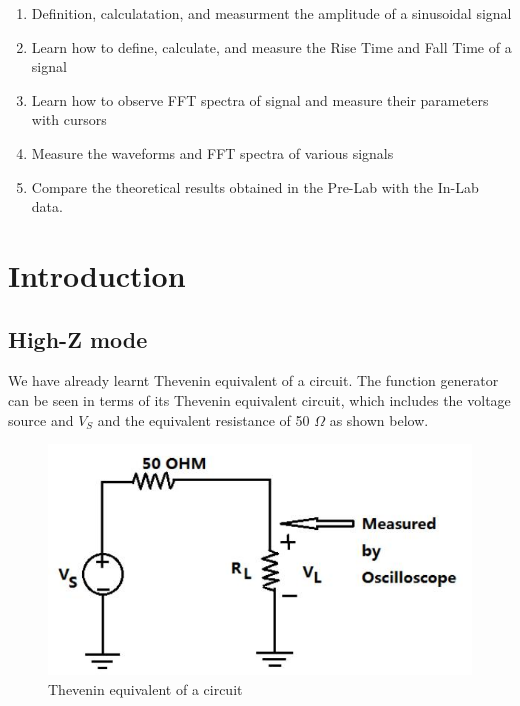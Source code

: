 \documentclass{article}
\begin{document}
\begin{enumerate}

\item

Definition, calculatation, and measurment the amplitude of a sinusoidal signal

\item

Learn how to define, calculate, and measure the Rise Time and Fall Time of a signal

\item

Learn how to observe FFT spectra of signal and measure their parameters with cursors

\item

Measure the waveforms and FFT spectra of various signals

\item

Compare the theoretical results obtained in the Pre-Lab with the In-Lab data.

\end{enumerate}

\section{Introduction}

\subsection{High-Z mode}

We have already learnt Thevenin equivalent of a circuit. The function generator can be seen in terms of its Thevenin equivalent circuit, which includes the voltage source and $V_S$ and the equivalent resistance of 50 $\Omega$ as shown below.
  \begin{figure}[H]
  \centering
  \includegraphics[width=.6\textwidth]{Figure1.jpg}
  \caption{Thevenin equivalent of a circuit}
  \label{img} 
\end{figure}
\end{document}
